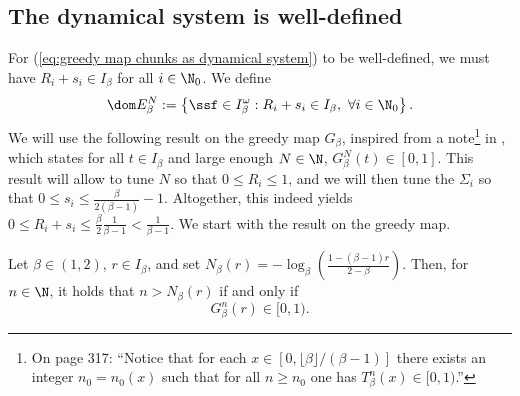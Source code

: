 
\subsection{The dynamical system is well-defined}



For (\ref{eq:greedy map chunks as dynamical system}) to be well-defined, we must have $R_i + s_i \in I_\beta$ for all $i \in \N_0$. We define
\begin{equation}
	\dom E_\beta^N := \left\{ \ssf \in I_\beta^\omega : R_i + s_i \in I_\beta, \ \forall i \in \N_0  \right\}.
\end{equation}
We will use the following result on the greedy map $G_\beta$, inspired from a note\footnote{On page 317: ``Notice that for each $x \in [0, \lfloor \beta\rfloor/(\beta-1)]$ there exists an integer $n_0 = n_0(x)$ such that for all $n \geq n_0$ one has $T_\beta^n(x) \in [0,1)$.''} in \cite[Section 1]{dajani2002greedy}, which states for all $t \in I_\beta$ and large enough $N \in \N$, $G_\beta^N(t) \in [0,1]$. This result will allow to tune $N$ so that $0 \leq R_i \leq 1$, and we will then tune the $\Sigma_i$ so that $0 \leq s_i \leq \frac{\beta}{2(\beta - 1)} - 1$. Altogether, this indeed yields $0 \leq R_i + s_i \leq \frac{\beta}{2} \frac{1}{\beta-1} < \frac{1}{\beta-1}$. We start with the result on the greedy map.
\begin{lemma}\label{ineq:greedy beta expansion}
	Let $\beta \in (1,2)$, $r \in I_\beta$, and set $N_\beta(r) =
		-\log_\beta\left(\frac{1-(\beta-1)r}{2 - \beta}\right)$. Then, for $n \in \N$, it holds that $n > N_\beta(r)$ if and only if
	\begin{equation}
		G^n_\beta(r) \in [0,1).
	\end{equation}
\end{lemma}
